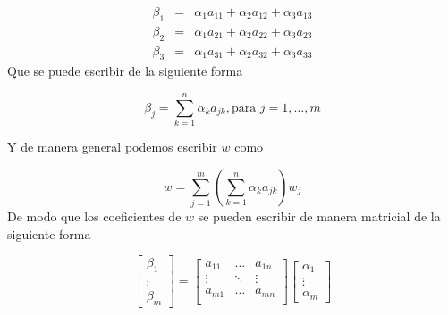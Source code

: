 \begin{eqnarray*}
\beta_1 &=& \alpha_1 a_{11} + \alpha_2 a_{12} + \alpha_3 a_{13} \\
\beta_2 &=& \alpha_1 a_{21} + \alpha_2 a_{22} + \alpha_3 a_{23} \\
\beta_3 &=& \alpha_1 a_{31} + \alpha_2 a_{32} + \alpha_3 a_{33} 
\end{eqnarray*}
Que se puede escribir de la siguiente forma

\begin{equation*}
\beta_j = \sum_{k=1}^{n} \alpha_k a_{jk}, \text{para } j=1, \dots, m
\end{equation*}

Y de manera general podemos escribir $w$ como

\begin{equation*}
w = \sum_{j=1}^{m} \left( \sum_{k=1}^{n} \alpha_k a_{jk} \right) w_j
\end{equation*}
De modo que los coeficientes de $w$ se pueden escribir de manera matricial de la siguiente forma

\begin{equation*}
\left[ \begin{array}{c}
      \beta_1 \\
      \vdots \\
      \beta_m 
\end{array}
\right] = \left[ \begin{array}{ccc}
      a_{11} & \dots & a_{1n}\\
      \vdots & \ddots & \vdots \\
      a_{m1} & \dots & a_{mn}\\
\end{array}
\right] \left[ \begin{array}{c}
      \alpha_1 \\
      \vdots \\
      \alpha_m 
\end{array}
\right]
\end{equation*}
